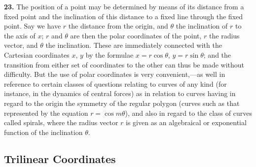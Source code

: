 \documentclass[11pt,a4paper]{book}
\begin{document}
\textbf{23.} The position of a point may be determined by means of its distance from a fixed point and the inclination of this distance to a fixed line through the fixed point. Say we have $r$ the distance from the origin, and $\theta$ the inclination of $r$ to the axis of $x$; $r$ and $\theta$ are then the polar coordinates of the point, $r$ the radius vector, and $\theta$ the inclination. These are immediately connected with the Cartesian coordinates $x$, $y$ by the formulae $x=r\cos\theta$, $y=r\sin\theta$; and the transition from either set of coordinates to the other can thus be made without difficulty. But the use of polar coordinates is very convenient,---as well in reference to certain classes of questions relating to curves of any kind (for instance, in the dynamics of central forces) as in relation to curves having in regard to the origin the symmetry of the regular polygon (curves such as that represented by the equation $r=\cos m\theta$), and also in regard to the class of curves called spirals, where the radius vector $r$ is given as an algebraical or exponential function of the inclination $\theta$.

\subsection*{Trilinear Coordinates}
\end{document}
